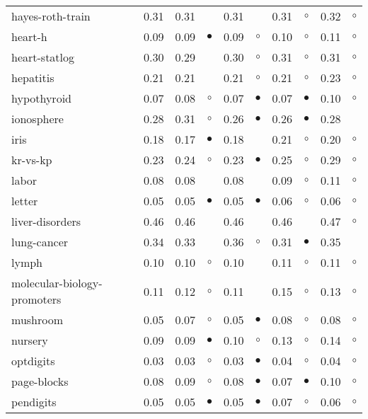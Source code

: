 \begin{table}[htb]
{\begin{tabular}{lrr@{\hspace{0.1cm}}cr@{\hspace{0.1cm}}cr@{\hspace{0.1cm}}cr@{\hspace{0.1cm}}c}
hayes-roth-train & 0.31 & 0.31 &            & 0.31 &            & 0.31 &   $\circ$ & 0.32 &   $\circ$\\
heart-h & 0.09 & 0.09 &  $\bullet$ & 0.09 &    $\circ$ & 0.10 &   $\circ$ & 0.11 &   $\circ$\\
heart-statlog & 0.30 & 0.29 &            & 0.30 &    $\circ$ & 0.31 &   $\circ$ & 0.31 &   $\circ$\\
hepatitis & 0.21 & 0.21 &            & 0.21 &    $\circ$ & 0.21 &   $\circ$ & 0.23 &   $\circ$\\
hypothyroid & 0.07 & 0.08 &    $\circ$ & 0.07 &  $\bullet$ & 0.07 & $\bullet$ & 0.10 &   $\circ$\\
ionosphere & 0.28 & 0.31 &    $\circ$ & 0.26 &  $\bullet$ & 0.26 & $\bullet$ & 0.28 &          \\
iris & 0.18 & 0.17 &  $\bullet$ & 0.18 &            & 0.21 &   $\circ$ & 0.20 &   $\circ$\\
kr-vs-kp & 0.23 & 0.24 &    $\circ$ & 0.23 &  $\bullet$ & 0.25 &   $\circ$ & 0.29 &   $\circ$\\
labor & 0.08 & 0.08 &            & 0.08 &            & 0.09 &   $\circ$ & 0.11 &   $\circ$\\
letter & 0.05 & 0.05 &  $\bullet$ & 0.05 &  $\bullet$ & 0.06 &   $\circ$ & 0.06 &   $\circ$\\
liver-disorders & 0.46 & 0.46 &            & 0.46 &            & 0.46 &           & 0.47 &   $\circ$\\
lung-cancer & 0.34 & 0.33 &            & 0.36 &    $\circ$ & 0.31 & $\bullet$ & 0.35 &          \\
lymph & 0.10 & 0.10 &    $\circ$ & 0.10 &            & 0.11 &   $\circ$ & 0.11 &   $\circ$\\
molecular-biology-promoters & 0.11 & 0.12 &    $\circ$ & 0.11 &            & 0.15 &   $\circ$ & 0.13 &   $\circ$\\
mushroom & 0.05 & 0.07 &    $\circ$ & 0.05 &  $\bullet$ & 0.08 &   $\circ$ & 0.08 &   $\circ$\\
nursery & 0.09 & 0.09 &  $\bullet$ & 0.10 &    $\circ$ & 0.13 &   $\circ$ & 0.14 &   $\circ$\\
optdigits & 0.03 & 0.03 &    $\circ$ & 0.03 &  $\bullet$ & 0.04 &   $\circ$ & 0.04 &   $\circ$\\
page-blocks & 0.08 & 0.09 &    $\circ$ & 0.08 &  $\bullet$ & 0.07 & $\bullet$ & 0.10 &   $\circ$\\
pendigits & 0.05 & 0.05 &  $\bullet$ & 0.05 &  $\bullet$ & 0.07 &   $\circ$ & 0.06 &   $\circ$\\

\end{tabular}}
\end{table}
